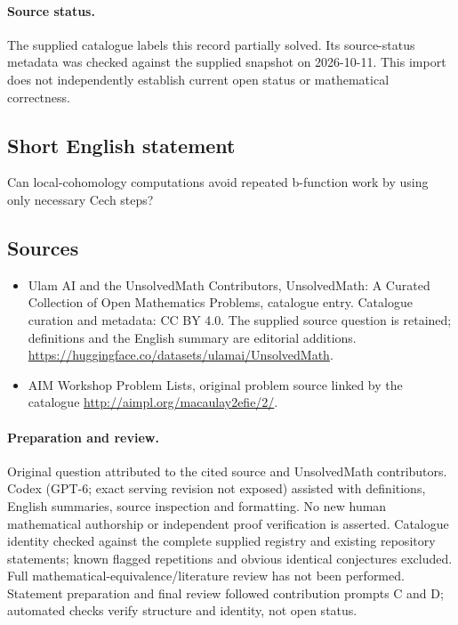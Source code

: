 \documentclass[11pt]{article}
\begin{document}
\paragraph{Source status.}
The supplied catalogue labels this record partially solved. Its source-status metadata was checked against the supplied snapshot on 2026-10-11. This import does not independently establish current open status or mathematical correctness.
\subsection{Short English statement}
Can local-cohomology computations avoid repeated b-function work by using only necessary Cech steps?
\subsection{Sources}
\begin{itemize}
\item[\hypertarget{source:statement:1}{S1}] Ulam AI and the UnsolvedMath Contributors, UnsolvedMath: A Curated Collection of Open Mathematics Problems, catalogue entry. Catalogue curation and metadata: CC BY 4.0. The supplied source question is retained; definitions and the English summary are editorial additions.
\url{https://huggingface.co/datasets/ulamai/UnsolvedMath}.
\item[\hypertarget{source:statement:2}{S2}] AIM Workshop Problem Lists, original problem source linked by the catalogue
\url{http://aimpl.org/macaulay2efie/2/}.
\end{itemize}
\paragraph{Preparation and review.}
Original question attributed to the cited source and UnsolvedMath contributors. Codex (GPT-6; exact serving revision not exposed) assisted with definitions, English summaries, source inspection and formatting. No new human mathematical authorship or independent proof verification is asserted. Catalogue identity checked against the complete supplied registry and existing repository statements; known flagged repetitions and obvious identical conjectures excluded. Full mathematical-equivalence/literature review has not been performed. Statement preparation and final review followed contribution prompts C and D; automated checks verify structure and identity, not open status.
\label{end:statement}
\end{document}
